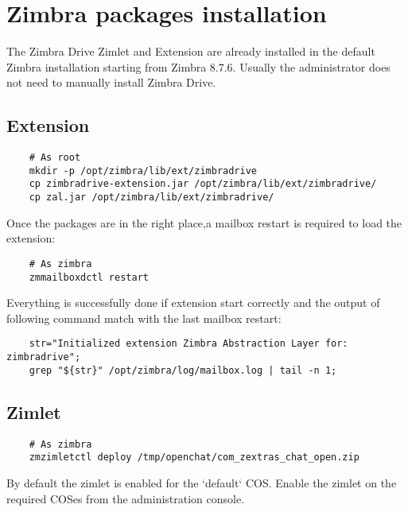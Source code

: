 \section{Zimbra packages installation}

\begin{warning}
    The Zimbra Drive Zimlet and Extension are already installed in the default Zimbra installation
    starting from Zimbra 8.7.6.
    Usually the administrator does not need to manually install Zimbra Drive.
\end{warning}

    \subsection{Extension}
    \begin{verbatim}
    # As root
    mkdir -p /opt/zimbra/lib/ext/zimbradrive
    cp zimbradrive-extension.jar /opt/zimbra/lib/ext/zimbradrive/
    cp zal.jar /opt/zimbra/lib/ext/zimbradrive/
    \end{verbatim}
    Once the packages are in the right place,a mailbox restart is required to load the extension:
    \begin{verbatim}
    # As zimbra
    zmmailboxdctl restart
    \end{verbatim}
    Everything is successfully done if extension start correctly and the output of following command match with the last mailbox restart:
    \begin{verbatim}
    str="Initialized extension Zimbra Abstraction Layer for: zimbradrive";
    grep "${str}" /opt/zimbra/log/mailbox.log | tail -n 1;
    \end{verbatim}

    \subsection{Zimlet}
    \begin{verbatim}
    # As zimbra
    zmzimletctl deploy /tmp/openchat/com_zextras_chat_open.zip
    \end{verbatim}
    By default the zimlet is enabled for the `default` COS.
    Enable the zimlet on the required COSes from the administration console.